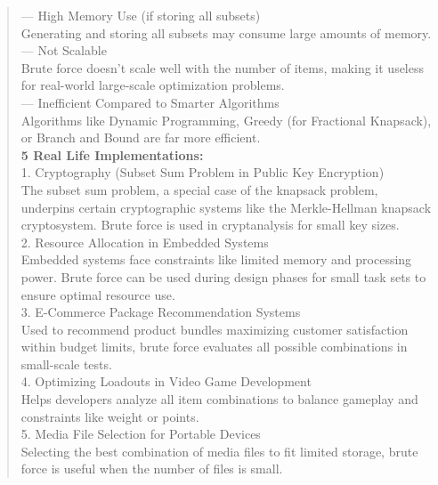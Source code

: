 \begin{quote}
    --- High Memory Use (if storing all subsets) \\
    Generating and storing all subsets may consume large amounts of memory. \\
    
    --- Not Scalable \\
    Brute force doesn’t scale well with the number of items, making it useless for real-world large-scale optimization problems. \\
    
    --- Inefficient Compared to Smarter Algorithms \\
    Algorithms like Dynamic Programming, Greedy (for Fractional Knapsack), or Branch and Bound are far more efficient. \\
    
    \textbf{5 Real Life Implementations:} \\
    1. Cryptography (Subset Sum Problem in Public Key Encryption) \\
    The subset sum problem, a special case of the knapsack problem, underpins certain cryptographic systems like the Merkle-Hellman knapsack cryptosystem. Brute force is used in cryptanalysis for small key sizes. \\
    
    2. Resource Allocation in Embedded Systems \\
    Embedded systems face constraints like limited memory and processing power. Brute force can be used during design phases for small task sets to ensure optimal resource use. \\
    
    3. E-Commerce Package Recommendation Systems \\
    Used to recommend product bundles maximizing customer satisfaction within budget limits, brute force evaluates all possible combinations in small-scale tests. \\
    
    4. Optimizing Loadouts in Video Game Development \\
    Helps developers analyze all item combinations to balance gameplay and constraints like weight or points. \\
    
    5. Media File Selection for Portable Devices \\
    Selecting the best combination of media files to fit limited storage, brute force is useful when the number of files is small. \\
    
\end{quote}
    